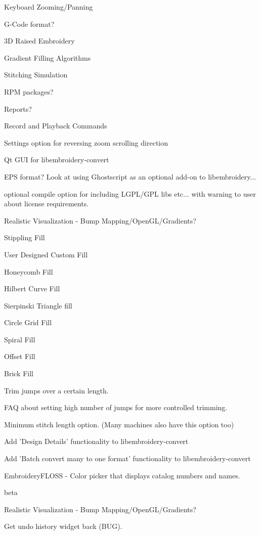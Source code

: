   \item Keyboard Zooming/Panning
  \item G-Code format?
  \item 3D Raised Embroidery
  \item Gradient Filling Algorithms
  \item Stitching Simulation
  \item RPM packages?
  \item Reports?
  \item Record and Playback Commands
  \item Settings option for reversing zoom scrolling direction
  \item Qt GUI for libembroidery-convert
  \item EPS format? Look at using Ghostscript as an optional add-on to libembroidery...
  \item optional compile option for including LGPL/GPL libs etc... with warning to user about license requirements.
  \item Realistic Visualization - Bump Mapping/OpenGL/Gradients?
  \item Stippling Fill
  \item User Designed Custom Fill
  \item Honeycomb Fill
  \item Hilbert Curve Fill
  \item Sierpinski Triangle fill
  \item Circle Grid Fill
  \item Spiral Fill
  \item Offset Fill
  \item Brick Fill
  \item Trim jumps over a certain length.
  \item FAQ about setting high number of jumps for more controlled trimming.
  \item Minimum stitch length option. (Many machines also have this option too)
  \item Add 'Design Details' functionality to libembroidery-convert
  \item Add 'Batch convert many to one format' functionality to libembroidery-convert
  \item EmbroideryFLOSS - Color picker that displays catalog numbers and names.
\item beta
  \item Realistic Visualization - Bump Mapping/OpenGL/Gradients?
  \item Get undo history widget back (BUG).
